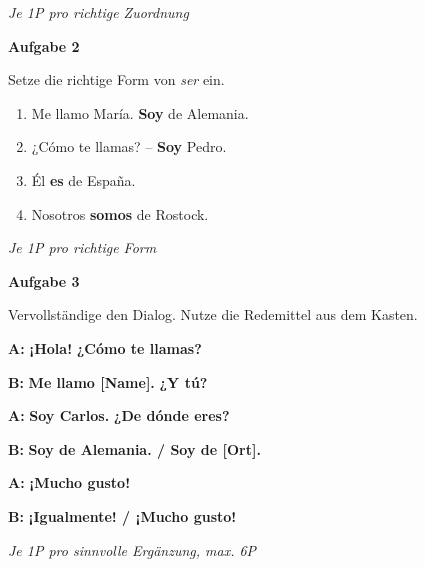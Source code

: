 \documentclass[11pt, a4paper]{article}
\newcommand{\fachfarbe}{spanisch}
\newcommand{\punktebox}[1]{\hfill\fbox{\small \_/#1}}
\newcommand{\loesung}[1]{\textcolor{loesung}{\textbf{#1}}}
\newcommand{\es}[1]{\textcolor{\fachfarbe}{\textbf{#1}}}
\newenvironment{aufgabe}[1]{%
    \vspace{10pt}
    \noindent\textbf{\textcolor{\fachfarbe}{Aufgabe #1}}
    \vspace{5pt}
    \begin{list}{}{\leftmargin=0pt}
    \item[]
}{%
    \end{list}
}
\begin{document}
\textit{\textcolor{grau}{Je 1P pro richtige Zuordnung}}

\vspace{15pt}


\begin{aufgabe}{2}
Setze die richtige Form von \textit{ser} ein. \punktebox{4}
\end{aufgabe}

\begin{enumerate}[label=\alph*)]
    \item Me llamo María. \loesung{Soy} de Alemania.
    \item ¿Cómo te llamas? -- \loesung{Soy} Pedro.
    \item Él \loesung{es} de España.
    \item Nosotros \loesung{somos} de Rostock.
\end{enumerate}

\textit{\textcolor{grau}{Je 1P pro richtige Form}}

\vspace{15pt}


\begin{aufgabe}{3}
Vervollständige den Dialog. Nutze die Redemittel aus dem Kasten. \punktebox{6}
\end{aufgabe}

\noindent
\textbf{A:} \es{¡Hola!} \loesung{¿Cómo te llamas?}

\textbf{B:} \loesung{Me llamo [Name].} \es{¿Y tú?}

\textbf{A:} \es{Soy Carlos.} \loesung{¿De dónde eres?}

\textbf{B:} \loesung{Soy de Alemania. / Soy de [Ort].}

\textbf{A:} \es{¡Mucho gusto!}

\textbf{B:} \loesung{¡Igualmente! / ¡Mucho gusto!}

\vspace{0.5em}
\textit{\textcolor{grau}{Je 1P pro sinnvolle Ergänzung, max. 6P}}

\vspace{15pt}

\end{document}
